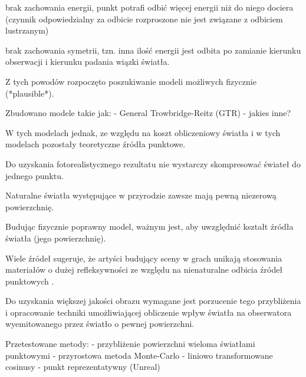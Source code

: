 \documentclass[../main.tex]{subfiles}
\begin{document}
brak zachowania energii, punkt potrafi odbić więcej energii niż do niego
dociera (czynnik odpowiedzialny za odbicie rozproszone nie jest związane
z odbiciem lustrzanym)

brak zachowania symetrii, tzn. inna ilość energii jest odbita po zamianie
kierunku obserwacji i kierunku padania wiązki światła.

Z tych powodów rozpoczęto poszukiwanie modeli możliwych fizycznie (*plausible*).

Zbudowano modele takie jak:
- General Trowbridge-Reitz (GTR)
- jakies inne?

W tych modelach jednak, ze względu na koszt obliczeniowy światła i w tych
modelach pozostały teoretyczne źródła punktowe.

Do uzyskania fotorealistycznego rezultatu nie wystarczy skompresować świateł do
jednego punktu.

Naturalne światła występujące w przyrodzie zawsze mają pewną niezerową
powierzchnię.

Budując fizycznie poprawny model, ważnym jest, aby uwzględnić kształt źródła
światła (jego powierzchnię).

Wiele źródeł sugeruje, że artyści budujący sceny w grach unikają stosowania
materiałów o dużej refleksywności ze względu na nienaturalne odbicia źródeł
punktowych \cite{pbr_frostbite} \cite{pbr_ue4}.

Do uzyskania większej jakości obrazu wymagane jest porzucenie tego przybliżenia
i opracowanie techniki umożliwiającej obliczenie wpływ światła na obserwatora
wyemitowanego przez światło o pewnej powierzchni.

Przetestowane metody:
- przybliżenie powierzchni wieloma światłami punktowymi
- przyrostowa metoda Monte-Carlo
- liniowo transformowane cosinusy
- punkt reprezentatywny (Unreal)
\end{document}
